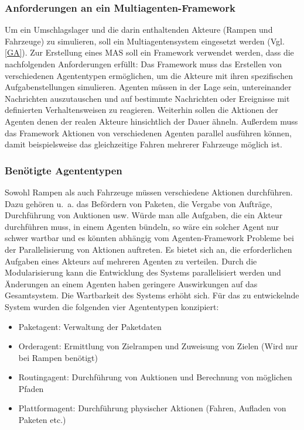 \subsubsection{Anforderungen an ein Multiagenten-Framework}
Um ein Umschlagslager und die darin enthaltenden Akteure (Rampen und Fahrzeuge) zu simulieren, soll ein Multiagentensystem eingesetzt werden (Vgl.\ref{GA}). Zur Erstellung eines MAS soll ein Framework verwendet werden, dass die nachfolgenden Anforderungen erfüllt: Das Framework muss das Erstellen von verschiedenen Agententypen ermöglichen, um die Akteure mit ihren spezifischen Aufgabenstellungen simulieren. Agenten müssen in der Lage sein, untereinander Nachrichten auszutauschen und auf bestimmte Nachrichten oder Ereignisse mit definierten Verhaltensweisen zu reagieren. Weiterhin sollen die Aktionen der Agenten denen der realen Akteure hinsichtlich der Dauer ähneln. Außerdem muss das Framework Aktionen von verschiedenen Agenten parallel ausführen können, damit beispielsweise das gleichzeitige Fahren mehrerer Fahrzeuge möglich ist.
\subsubsection{Benötigte Agententypen}
Sowohl Rampen als auch Fahrzeuge müssen verschiedene Aktionen durchführen. Dazu gehören u.~a. das Befördern von Paketen, die Vergabe von Aufträge, Durchführung von Auktionen usw. Würde man alle Aufgaben, die ein Akteur durchführen muss, in einem Agenten bündeln, so wäre ein solcher Agent nur schwer wartbar und es könnten abhängig vom Agenten-Framework Probleme bei der Parallelisierung von Aktionen auftreten. Es bietet sich an, die erforderlichen Aufgaben eines Akteurs auf mehreren Agenten zu verteilen. Durch die Modularisierung kann die Entwicklung des Systems parallelisiert werden und Änderungen an einem Agenten haben geringere Auswirkungen auf das Gesamtsystem. Die Wartbarkeit des Systems erhöht sich. Für das zu entwickelnde System wurden die folgenden vier Agententypen konzipiert:  
\begin{itemize}
\item Paketagent: Verwaltung der Paketdaten
\item Orderagent: Ermittlung von Zielrampen und Zuweisung von Zielen (Wird nur bei Rampen benötigt)
\item Routingagent: Durchführung von Auktionen und Berechnung von möglichen Pfaden
\item Plattformagent: Durchführung physischer Aktionen (Fahren, Aufladen von Paketen etc.)
\end{itemize}
